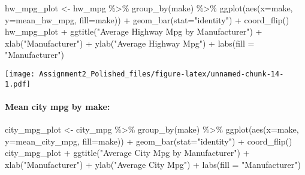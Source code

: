 \documentclass[
]{article}
\newenvironment{Shaded}{\begin{snugshade}}{\end{snugshade}}
\newcommand{\AttributeTok}[1]{\textcolor[rgb]{0.77,0.63,0.00}{#1}}
\newcommand{\FunctionTok}[1]{\textcolor[rgb]{0.00,0.00,0.00}{#1}}
\newcommand{\NormalTok}[1]{#1}
\newcommand{\OtherTok}[1]{\textcolor[rgb]{0.56,0.35,0.01}{#1}}
\newcommand{\SpecialCharTok}[1]{\textcolor[rgb]{0.00,0.00,0.00}{#1}}
\newcommand{\StringTok}[1]{\textcolor[rgb]{0.31,0.60,0.02}{#1}}
\begin{document}
\begin{Shaded}
\begin{Highlighting}[]
\NormalTok{hw\_mpg\_plot }\OtherTok{\textless{}{-}}\NormalTok{ hw\_mpg }\SpecialCharTok{\%\textgreater{}\%} \FunctionTok{group\_by}\NormalTok{(make) }\SpecialCharTok{\%\textgreater{}\%} \FunctionTok{ggplot}\NormalTok{(}\FunctionTok{aes}\NormalTok{(}\AttributeTok{x=}\NormalTok{make, }\AttributeTok{y=}\NormalTok{mean\_hw\_mpg, }\AttributeTok{fill=}\NormalTok{make)) }\SpecialCharTok{+} \FunctionTok{geom\_bar}\NormalTok{(}\AttributeTok{stat=}\StringTok{"identity"}\NormalTok{) }\SpecialCharTok{+} \FunctionTok{coord\_flip}\NormalTok{()}
\NormalTok{hw\_mpg\_plot }\SpecialCharTok{+} \FunctionTok{ggtitle}\NormalTok{(}\StringTok{"Average Highway Mpg by Manufacturer"}\NormalTok{) }\SpecialCharTok{+} \FunctionTok{xlab}\NormalTok{(}\StringTok{"Manufacturer"}\NormalTok{) }\SpecialCharTok{+} \FunctionTok{ylab}\NormalTok{(}\StringTok{"Average Highway Mpg"}\NormalTok{) }\SpecialCharTok{+} \FunctionTok{labs}\NormalTok{(}\AttributeTok{fill =} \StringTok{"Manufacturer"}\NormalTok{)}
\end{Highlighting}
\end{Shaded}

\texttt{[image: Assignment2\_Polished\_files/figure-latex/unnamed-chunk-14-1.pdf]}

\hypertarget{mean-city-mpg-by-make}{%
\paragraph{Mean city mpg by make:}\label{mean-city-mpg-by-make}}

\begin{Shaded}
\begin{Highlighting}[]
\NormalTok{city\_mpg\_plot }\OtherTok{\textless{}{-}}\NormalTok{ city\_mpg }\SpecialCharTok{\%\textgreater{}\%} \FunctionTok{group\_by}\NormalTok{(make) }\SpecialCharTok{\%\textgreater{}\%} \FunctionTok{ggplot}\NormalTok{(}\FunctionTok{aes}\NormalTok{(}\AttributeTok{x=}\NormalTok{make, }\AttributeTok{y=}\NormalTok{mean\_city\_mpg, }\AttributeTok{fill=}\NormalTok{make)) }\SpecialCharTok{+} \FunctionTok{geom\_bar}\NormalTok{(}\AttributeTok{stat=}\StringTok{"identity"}\NormalTok{) }\SpecialCharTok{+} \FunctionTok{coord\_flip}\NormalTok{()}
\NormalTok{city\_mpg\_plot }\SpecialCharTok{+} \FunctionTok{ggtitle}\NormalTok{(}\StringTok{"Average City Mpg by Manufacturer"}\NormalTok{) }\SpecialCharTok{+} \FunctionTok{xlab}\NormalTok{(}\StringTok{"Manufacturer"}\NormalTok{) }\SpecialCharTok{+} \FunctionTok{ylab}\NormalTok{(}\StringTok{"Average City Mpg"}\NormalTok{) }\SpecialCharTok{+} \FunctionTok{labs}\NormalTok{(}\AttributeTok{fill =} \StringTok{"Manufacturer"}\NormalTok{)}
\end{Highlighting}
\end{Shaded}
\end{document}
